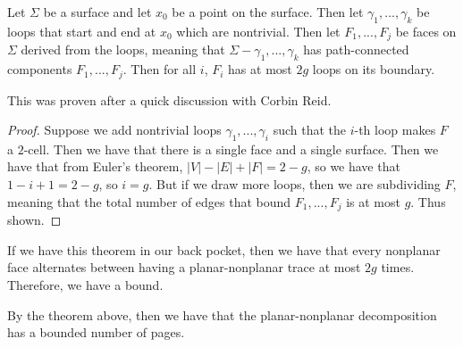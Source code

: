 \begin{lemma}
	Let $\Sigma$ be a surface and let $x_0$ be a point on the surface. Then let $\gamma_1, ..., \gamma_k$ be loops that start and end at $x_0$ which are nontrivial. Then let $F_1, ..., F_j$ be faces on $\Sigma$ derived from the loops, meaning that $\Sigma - \gamma_1, ..., \gamma_k$ has path-connected components $F_1, ..., F_j$. Then for all $i$, $F_i$ has at most $2g$ loops on its boundary.
\end{lemma}

This was proven after a quick discussion with Corbin Reid.

\begin{proof}
	Suppose we add nontrivial loops $\gamma_1, ..., \gamma_i$ such that the $i$-th loop makes $F$ a $2$-cell. Then we have that there is a single face and a single surface. Then we have that from Euler's theorem, $|V| - |E| + |F| = 2 - g$, so we have that $ 1 - i + 1 = 2 - g$, so $i = g$. But if we draw more loops, then we are subdividing $F$, meaning that the total number of edges that bound $F_1, ..., F_j$ is at most $g$. Thus shown.
\end{proof}

If we have this theorem in our back pocket, then we have that every nonplanar face alternates between having a planar-nonplanar trace at most $2g$ times. Therefore, we have a bound. 

By the theorem above, then we have that the planar-nonplanar decomposition has a bounded number of pages. 
